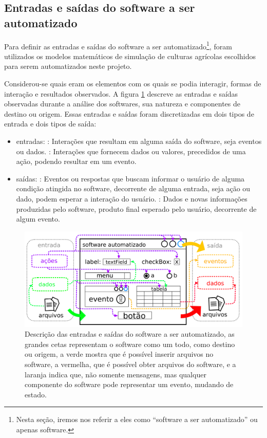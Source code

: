 \documentclass[tg]{mdtufsm}
\begin{document}
            \subsection{Entradas e saídas do software a ser automatizado}

                Para definir as entradas e saídas do software a ser automatizado\footnote{Nesta seção, iremos nos referir a eles como “software a ser automatizado” ou apenas software.}, foram utilizados os modelos matemáticos de simulação de culturas agrícolas escolhidos para serem automatizados neste projeto.

                Considerou-se quais eram os elementos com os quais se podia interagir, formas de interação e resultados observados. A figura \ref{fig:modelIO} descreve as entradas e saídas observadas durante a análise dos softwares, sua natureza e componentes de destino ou origem. Essas entradas e saídas foram discretizadas em dois tipos de entrada e dois tipos de saída:

                \begin{itemize}
                    \item entradas:
                        : Interações que resultam em alguma saída do software, seja eventos ou dados.
                        : Interações que fornecem dados ou valores, precedidos de uma ação, podendo resultar em um evento.
                    \item saídas:
                        : Eventos ou respostas que buscam informar o usuário de alguma condição atingida no software, decorrente de alguma entrada, seja ação ou dado, podem esperar a interação do usuário.
                        : Dados e novas informações produzidas pelo software, produto final esperado pelo usuário, decorrente de algum evento.
                \end{itemize}

                \begin{figure}[!htb]
                    {\centering
                    \includegraphics[width=1.0\textwidth]{imagens/modelIO}
                    \caption{Descrição das entradas e saídas do software a ser automatizado, as grandes cetas representam o software como um todo, como destino ou origem, a verde mostra que é possível inserir arquivos no software, a vermelha, que é possível obter arquivos do software, e a laranja indica que, não somente mensagens, mas qualquer componente do software pode representar um evento, mudando de estado.}
                    \label{fig:modelIO}}
                \end{figure}
\end{document}

